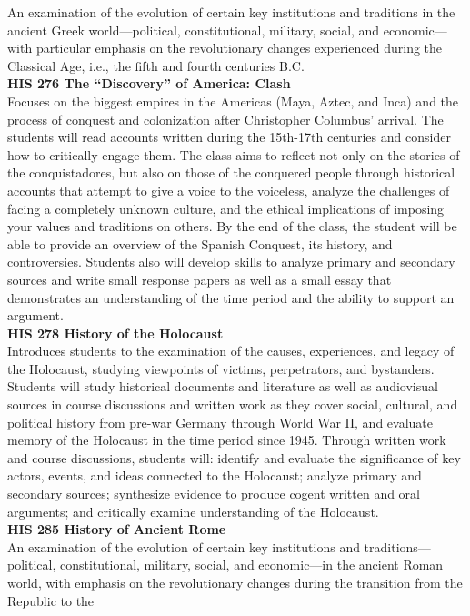 \documentclass[
  letterpaper,
]{scrbook}
\begin{document}
An examination of the evolution of certain key institutions and
traditions in the ancient Greek world---political, constitutional,
military, social, and economic---with particular emphasis on the
revolutionary changes experienced during the Classical Age, i.e., the
fifth and fourth centuries B.C.\\
\textbf{HIS 276 The ``Discovery'' of America: Clash}\\
Focuses on the biggest empires in the Americas (Maya, Aztec, and Inca)
and the process of conquest and colonization after Christopher Columbus'
arrival. The students will read accounts written during the 15th-17th
centuries and consider how to critically engage them. The class aims to
reflect not only on the stories of the conquistadores, but also on those
of the conquered people through historical accounts that attempt to give
a voice to the voiceless, analyze the challenges of facing a completely
unknown culture, and the ethical implications of imposing your values
and traditions on others. By the end of the class, the student will be
able to provide an overview of the Spanish Conquest, its history, and
controversies. Students also will develop skills to analyze primary and
secondary sources and write small response papers as well as a small
essay that demonstrates an understanding of the time period and the
ability to support an argument.\\
\textbf{HIS 278 History of the Holocaust}\\
Introduces students to the examination of the causes, experiences, and
legacy of the Holocaust, studying viewpoints of victims, perpetrators,
and bystanders. Students will study historical documents and literature
as well as audiovisual sources in course discussions and written work as
they cover social, cultural, and political history from pre-war Germany
through World War II, and evaluate memory of the Holocaust in the time
period since 1945. Through written work and course discussions, students
will: identify and evaluate the significance of key actors, events, and
ideas connected to the Holocaust; analyze primary and secondary sources;
synthesize evidence to produce cogent written and oral arguments; and
critically examine understanding of the Holocaust.\\
\textbf{HIS 285 History of Ancient Rome}\\
An examination of the evolution of certain key institutions and
traditions---political, constitutional, military, social, and
economic---in the ancient Roman world, with emphasis on the
revolutionary changes during the transition from the Republic to the
\end{document}
